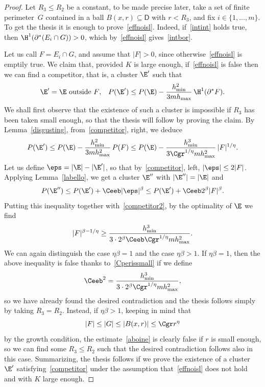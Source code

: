 \begin{proof}
Let $R_3\leq R_2$ be a constant, to be made precise later, take a set of finite perimeter~$G$ contained in a ball $B(x,r)\subseteq \mathsf{D}$ with $r<R_3$, and fix $i\in\{1,\dots,m\}$. To get the thesis it is enough to prove~\eqref{effnoisl}. Indeed, if~\eqref{intint} holds true, then $\H^1(\partial^*(E_i\cap G))>0$, which by~\eqref{effnoisl} gives~\eqref{intbor}.

Let us call $F=E_i\cap G$, and assume that $|F|>0$, since otherwise~\eqref{effnoisl} is emptily true. We claim that, provided $K$ is large enough, if~\eqref{effnoisl} is false then we can find a competitor, that is, a cluster $\E'$ such that
\begin{align}\label{competitor}
\E'=\E \hbox{ outside $F$}, && P(\E')\leq P(\E) - \frac{h_{\min}^2}{3mh_{\max}}\, \H^1(\partial^* F).
\end{align}
We shall first observe that the existence of such a cluster is impossible if $R_3$ has been taken small enough, so that the thesis will follow by proving the claim. By Lemma~\ref{disgusting}, from~\eqref{competitor}, right, we deduce
\begin{equation}\label{competitor2}
P(\E') \leq P(\E)- \frac{h_{\min}^2}{3mh_{\max}^2}\, P(F)
\leq P(\E) - \frac{h_{\min}^3}{3\Cgr^{1/\eta}mh_{\max}^2}\, |F|^{1/\eta}.
\end{equation}
Let us define $\eps=|\E|-|\E'|$, so that by~\eqref{competitor}, left, $|\eps|\leq 2|F|$. Applying Lemma~\ref{labello}, we get a cluster $\E''$ with $|\E''|=|\E|$ and
\[
P(\E'')\leq P(\E') + \Ceeb |\eps|^\beta \leq P(\E') + \Ceeb 2^\beta |F|^\beta.
\]
Putting this inequality together with~\eqref{competitor2}, by the optimality of $\E$ we find
\begin{equation}\label{aboine}
|F|^{\beta-1/\eta}\geq \frac{h_{\min}^3}{3\cdot 2^\beta \Ceeb \Cgr^{1/\eta} m h_{\max}^2}.
\end{equation}
We can again distinguish the case $\eta\beta=1$ and the case $\eta\beta>1$. If $\eta\beta=1$, then the above inequality is false thanks to~\eqref{Cperissmall} if we define
\begin{equation}\label{ceeb2}
\Ceeb^2=\frac{h_{\min}^3}{3\cdot 2^\beta \Cgr^{1/\eta} m h_{\max}^2},
\end{equation}
so we have already found the desired contradiction and the thesis follows simply by taking $R_3=R_2$. Instead, if $\eta\beta>1$, keeping in mind that
\[
|F|\leq |G|\leq |B(x,r)| \leq \Cgr r^\eta
\]
by the growth condition, the estimate~\eqref{aboine} is clearly false if $r$ is small enough, so we can find some $R_3\leq R_2$ such that the desired contradiction follows also in this case. Summarizing, the thesis follows if we prove the existence of a cluster $\E'$ satisfying~\eqref{competitor} under the assumption that~\eqref{effnoisl} does not hold and with $K$ large enough.


\end{proof}
